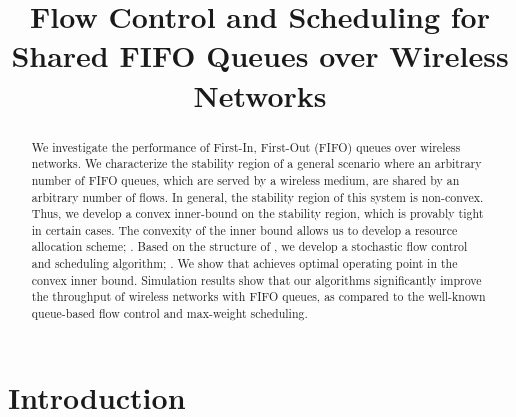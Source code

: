 \documentclass[conference]{IEEEtran}
\begin{document}
\title{Flow Control and Scheduling for Shared FIFO Queues over Wireless Networks \vspace{-5pt}  }



\author{
 \and
 \and
{}
}

\maketitle





{}\vspace{-35pt}{}

\allowdisplaybreaks


\begin{abstract}
We investigate the performance of First-In, First-Out (FIFO) queues over wireless networks. We characterize the stability region of a general scenario where an arbitrary number of FIFO queues, which are served by a wireless medium, are shared by an arbitrary number of flows. In general, the stability region of this system is non-convex. Thus, we develop a convex inner-bound on the stability region, which is provably tight in certain cases. The convexity of the inner bound allows us to develop a resource allocation scheme; . Based on the structure of , we develop a stochastic flow control and scheduling algorithm; . We show that  achieves optimal operating point in the convex inner bound. Simulation results show that our algorithms significantly improve the throughput of wireless networks with FIFO queues, as compared to the well-known queue-based flow control and max-weight scheduling. 
\end{abstract}

\section{Introduction}\label{sec:intro}
\end{document}
